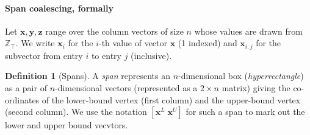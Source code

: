 \documentclass[9pt]{sigplanconf}
\newcounter{block}
\theoremstyle{definition}
\newtheorem{definition}[block]{Definition}
\newcommand{\vect}[1]{\textbf{#1}}
\begin{document}
\paragraph{Span coalescing, formally}

Let $\vect{x}, \vect{y}, \vect{z}$ range over the column vectors of size
$n$ whose values are drawn from $\mathbb{Z}_\top$.
We write $\vect{x}_i$ for the $i$-th value of vector $\vect{x}$ (1
indexed) and $\vect{x}_{i:j}$ for the subvector from entry $i$ to
entry $j$ (inclusive). 

\begin{definition}[Spans]
  A \emph{span} represents an $n$-dimensional box (\emph{hyperrectangle}) as
  a pair of $n$-dimensional vectors (represented as a $2 \times n$
  matrix) giving the co-ordinates of the lower-bound vertex (first
  column) and the upper-bound vertex (second column). We use the
  notation $[\vect{x}^L \; \vect{x}^U]$ for such a span to mark out
  the lower and upper bound vecvtors. 
\end{definition}
\end{document}

